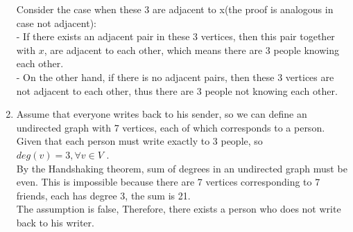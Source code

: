 \documentclass[a4paper]{article}
\begin{document}
\begin{enumerate}
		      Consider the case when these 3 are adjacent to x(the proof is analogous in case not adjacent): \\
		      - If there exists an adjacent pair in these 3 vertices, then this pair together with $x$, are adjacent to each other, which means there are 3 people knowing each other. \\
		      - On the other hand, if there is no adjacent pairs, then these 3 vertices are not adjacent to each other, thus there are 3 people not knowing each other.
		\item Assume that everyone writes back to his sender, so we can define an undirected graph with 7 vertices, each of which corresponds to a person. Given that each person must write exactly to 3 people, so $deg(v) = 3, \forall v \in V$ . \\
		      By the Handshaking theorem, sum of degrees in an undirected graph must be even. This is impossible because there are 7 vertices corresponding to 7 friends, each has degree 3, the sum is 21. \\
		      The assumption is false, Therefore, there exists a person who does not write back to his writer.
	\end{enumerate}
	
\end{document}
